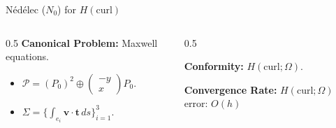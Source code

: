 \documentclass[aspectratio=169]{beamer}
\begin{document}
\begin{frame}{N\'ed\'elec ($N_0$) for $H(\text{curl})$}
    \begin{columns}
        \begin{column}{0.5\textwidth}
            \textbf{Canonical Problem:} Maxwell equations.
            \begin{itemize}
                \item $\mathcal{P} = (P_0)^2 \oplus \begin{pmatrix} -y \\ x \end{pmatrix} P_0$.
                \item $\Sigma = \{ \int_{e_i} \bm{v} \cdot \bm{t} \, ds \}_{i=1}^3$.
            \end{itemize}
        \end{column}
        \begin{column}{0.5\textwidth}
            \begin{center}
            \end{center}

            \textbf{Conformity:} $H(\text{curl}; \Omega)$.

            \textbf{Convergence Rate:} $H(\text{curl};\Omega)$ error: $O(h)$
        \end{column}
    \end{columns}
\end{frame}
\end{document}
